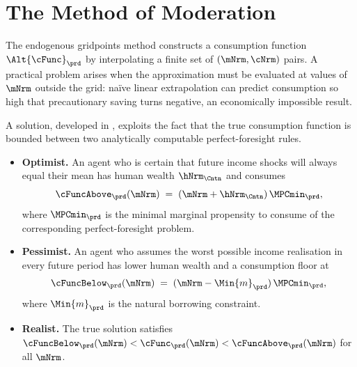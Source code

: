 \hypertarget{method-of-moderation}{}
\section{The Method of Moderation}\label{sec:method-of-moderation}

The endogenous gridpoints method constructs a consumption function
$\Alt{\cFunc}_{\prd}$ by interpolating a finite set of
$(\mNrm,\cNrm)$ pairs.  A practical problem arises when the
approximation must be evaluated at values of $\mNrm$ outside the
grid: na\"ive linear extrapolation can predict consumption so high
that precautionary saving turns negative, an economically impossible
result.

A solution, developed in \cite{method-of-moderation}, exploits the fact that the
true consumption function is bounded between two analytically
computable perfect-foresight rules.
\begin{itemize}
  \item \textbf{Optimist.} An agent who is certain that future income
  shocks will always equal their mean has human wealth
  $\hNrm_{\Cntn}$ and consumes
  \begin{equation}
    \cFuncAbove_{\prd}(\mNrm) \;=\;
      (\mNrm + \hNrm_{\Cntn})\,\MPCmin_{\prd},
      \label{eq:cFuncAboveBrief}
  \end{equation}
  where $\MPCmin_{\prd}$ is the minimal marginal propensity to
  consume of the corresponding perfect-foresight problem.
  \item \textbf{Pessimist.} An agent who assumes the worst possible
  income realisation in every future period has lower human wealth and
  a consumption floor at
  \begin{equation}
    \cFuncBelow_{\prd}(\mNrm) \;=\;
      (\mNrm - \Min{m}_{\prd})\,\MPCmin_{\prd},
      \label{eq:cFuncBelowBrief}
  \end{equation}
  where $\Min{m}_{\prd}$ is the natural borrowing constraint.
  \item \textbf{Realist.}  The true solution satisfies
  $\cFuncBelow_{\prd}(\mNrm) < \cFunc_{\prd}(\mNrm) <
  \cFuncAbove_{\prd}(\mNrm)$ for all $\mNrm$.
\end{itemize}

